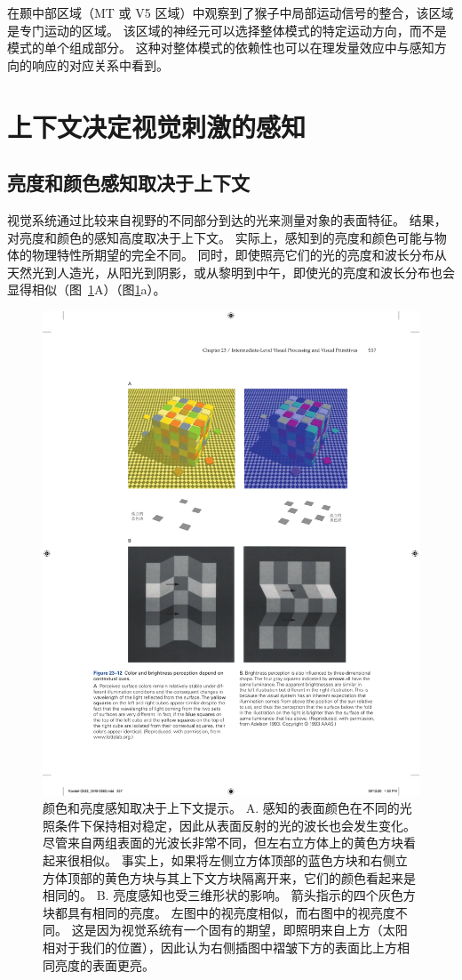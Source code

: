 在颞中部区域（MT 或 V5 区域）中观察到了猴子中局部运动信号的整合，该区域是专门运动的区域。
该区域的神经元可以选择整体模式的特定运动方向，而不是模式的单个组成部分。
这种对整体模式的依赖性也可以在理发量效应中与感知方向的响应的对应关系中看到。



\section{上下文决定视觉刺激的感知}

\subsection{亮度和颜色感知取决于上下文}

视觉系统通过比较来自视野的不同部分到达的光来测量对象的表面特征。
结果，对亮度和颜色的感知高度取决于上下文。
实际上，感知到的亮度和颜色可能与物体的物理特性所期望的完全不同。
同时，即使照亮它们的光的亮度和波长分布从天然光到人造光，从阳光到阴影，或从黎明到中午，即使光的亮度和波长分布也会显得相似（图~\ref{fig:23_12}A）（图\ref{fig:23_12}a）。


\begin{figure}[htbp]
	\centering
	\includegraphics[width=0.7\linewidth]{chap23/fig_23_12}
	\caption{颜色和亮度感知取决于上下文提示。
		A. 感知的表面颜色在不同的光照条件下保持相对稳定，因此从表面反射的光的波长也会发生变化。
		尽管来自两组表面的光波长非常不同，但左右立方体上的黄色方块看起来很相似。
		事实上，如果将左侧立方体顶部的蓝色方块和右侧立方体顶部的黄色方块与其上下文方块隔离开来，它们的颜色看起来是相同的。
		B. 亮度感知也受三维形状的影响。
		箭头指示的四个灰色方块都具有相同的亮度。
		左图中的视亮度相似，而右图中的视亮度不同。
		这是因为视觉系统有一个固有的期望，即照明来自上方（太阳相对于我们的位置），因此认为右侧插图中褶皱下方的表面比上方相同亮度的表面更亮\cite{adelson1993perceptual}。}
	\label{fig:23_12}
\end{figure}


